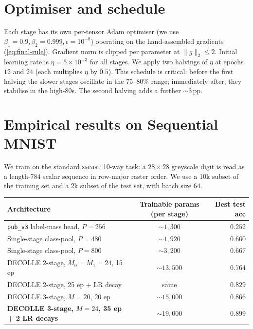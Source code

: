 \documentclass[11pt]{article}
\begin{document}
\section{Optimiser and schedule}

Each stage has its own per-tensor Adam optimiser (we use
$\beta_1 = 0.9, \beta_2 = 0.999, \epsilon = 10^{-8}$) operating on the
hand-assembled gradients (\ref{eq:final-rule}). Gradient norm is clipped
per parameter at $\| g \|_2 \le 2$. Initial learning rate is
$\eta = 5 \times 10^{-3}$ for all stages. We apply two halvings of
$\eta$ at epochs $12$ and $24$ (each multiplies $\eta$ by $0.5$). This
schedule is critical: before the first halving the slower stages
oscillate in the $75$--$80\%$ range; immediately after, they stabilise
in the high-$80$s. The second halving adds a further $\sim 3$\,pp.

\section{Empirical results on Sequential MNIST}

We train on the standard \textsc{smnist} 10-way task: a
$28\times 28$ greyscale digit is read as a length-$784$ scalar
sequence in row-major raster order. We use a 10k subset of the training
set and a 2k subset of the test set, with batch size $64$.

\begin{center}
\captionsetup{type=table}
\begin{tabular}{@{}lcr@{}}
\toprule
Architecture & Trainable params (per stage) & Best test acc \\
\midrule
\texttt{pub\_v3} label-mass head, $P=256$ & $\sim 1{,}300$ & $0.252$ \\
Single-stage class-pool, $P=480$       & $\sim 1{,}920$ & $0.660$ \\
Single-stage class-pool, $P=800$       & $\sim 3{,}200$ & $0.667$ \\
DECOLLE 2-stage, $M_0=M_1=24$, 15 ep   & $\sim 13{,}500$ & $0.764$ \\
DECOLLE 2-stage, 25 ep + LR decay      & same           & $0.829$ \\
DECOLLE 3-stage, $M=20$, 20 ep         & $\sim 15{,}000$ & $0.866$ \\
\textbf{DECOLLE 3-stage, $M=24$, 35 ep + 2 LR decays} & $\sim 19{,}000$
                                              & $\boldsymbol{0.899}$ \\
\bottomrule
\end{tabular}
\end{center}
\end{document}
